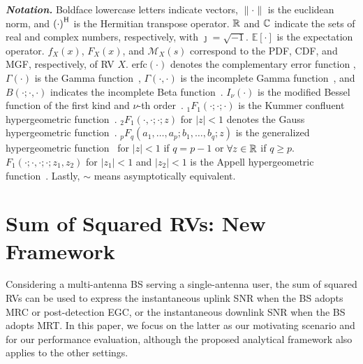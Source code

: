 \documentclass[journal,twocolumn]{IEEEtran}
\begin{document}
\smallskip

\textit{\textbf{Notation.}} Boldface lowercase letters indicate vectors, $\lVert \cdot\rVert$ is the euclidean norm, and $\left(\cdot\right)^{\herm}$ is the Hermitian transpose operator. $\mbox{$\mathbb{R}$}$ and $\mbox{$\mathbb{C}$}$ indicate the sets of real and complex numbers, respectively, with $\jmath = \sqrt{-1}$. $\mathbb{E}[\cdot]$ is the expectation operator. $f_X(x)$, $F_X(x)$, and $\mathcal{M}_X(s)$ correspond to the \ac{PDF}, \ac{CDF}, and \ac{MGF}, respectively, of \ac{RV} $X$.
$\text{erfc}(\cdot)$ denotes the complementary error function \cite[Eq.~(06.27.07.0001.01)]{WolframResearch}, $\Gamma(\cdot)$ is the Gamma function~\cite[Eq.~(06.05.02.0001.01)]{WolframResearch}, $\Gamma(\cdot,\cdot)$ is the incomplete Gamma function~\cite[Eq.~(06.06.02.0001.01)]{WolframResearch}, and $B(\cdot;\cdot,\cdot)$ indicates the incomplete Beta function~\cite[Eq.~(06.19.02.0001.01)]{WolframResearch}. $I_\nu(\cdot)$ is the modified Bessel function of the first kind and $\nu$-th order~\cite[Eq.~(03.02.02.0001.01)]{WolframResearch}. $_1 F_1 (\cdot;\cdot;\cdot)$ is the Kummer confluent hypergeometric function~\cite[Eq.~(07.20.02.0001.01)]{WolframResearch}. $ _2F_1(\cdot,\cdot;\cdot;z)$ for $|z|<1$ denotes the Gauss hypergeometric function~\cite[Eq.~(07.23.02.0001.01)]{WolframResearch}. $_p F_q (a_1,\ldots,a_p;b_1,\ldots,b_q;z)$ is the generalized hypergeometric function~\cite[Eq.~(07.31.02.0001.01)]{WolframResearch} for $|z|<1$ if $q=p-1$ or $\forall z \in \mbox{$\mathbb{R}$}$ if $q \geq p $. $F_1 (\cdot;\cdot,\cdot;\cdot;z_1,z_2)$ for $|z_1|<1$ and $|z_2|<1$ is the Appell hypergeometric function~\cite[Eq.~(07.36.02.0001.01)]{WolframResearch}. Lastly, $\sim$ means asymptotically equivalent.


\section{Sum of Squared \acp{RV}: New Framework}\label{sec:newrep}

Considering a multi-antenna \ac{BS} serving a single-antenna user, the sum of squared \acp{RV} can be used to express the instantaneous uplink \ac{SNR} when the \ac{BS} adopts \ac{MRC} or post-detection \ac{EGC}, or the instantaneous downlink \ac{SNR} when the \ac{BS} adopts \ac{MRT}. In this paper, we focus on the latter as our motivating scenario and for our performance evaluation, although the proposed analytical framework also applies to the other settings.
\end{document}
